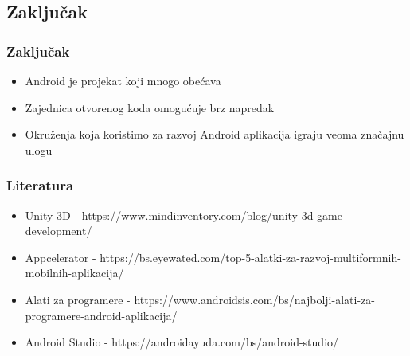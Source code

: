 \documentclass{beamer}
\begin{document}
\begin{frame}
    \section{Zaključak}
    \frametitle{Zaključak} 
    \begin{itemize}
	\item Android je projekat koji mnogo obećava
	\item Zajednica otvorenog koda omogućuje brz napredak
	\item Okruženja koja koristimo za razvoj Android aplikacija igraju veoma značajnu ulogu
	
   \end{itemize}
\end{frame}

\begin{frame}
    \frametitle{Literatura}
    \begin{itemize}
    	\item Unity 3D - https://www.mindinventory.com/blog/unity-3d-game-development/
	\item Appcelerator - https://bs.eyewated.com/top-5-alatki-za-razvoj-multiformnih-mobilnih-aplikacija/
	\item Alati za programere - https://www.androidsis.com/bs/najbolji-alati-za-programere-android-aplikacija/
	\item Android Studio - https://androidayuda.com/bs/android-studio/
   \end{itemize}
\end{frame}
\end{document}

